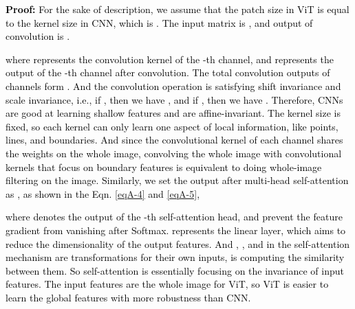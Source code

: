 \documentclass[lettersize,journal]{IEEEtran}
\begin{document}
\textcolor{black}{\textbf{Proof:} For the sake of description, we assume that the patch size in ViT is equal to the kernel size in CNN, which is . The input matrix is , and output of convolution is .
\vspace{-2mm}

where  represents the convolution kernel of the -th channel, and  represents the output of the -th channel after convolution. The total convolution outputs of  channels form . And the convolution operation  is satisfying shift invariance and scale invariance, i.e., if , then we have , and if , then we have . Therefore, CNNs are good at learning shallow features and are affine-invariant. The kernel size is fixed, so each kernel can only learn one aspect of local information, like points, lines, and boundaries. And since the convolutional kernel  of each channel shares the weights on the whole image, convolving the whole image with convolutional kernels that focus on boundary features is equivalent to doing whole-image filtering on the image. Similarly, we set the output after multi-head self-attention as , as shown in the Eqn. \ref{eqA-4} and \ref{eqA-5},
   \vspace{-1mm}
    
where  denotes the output of the -th self-attention head, and  prevent the feature gradient from vanishing after Softmax.  represents the linear layer, which aims to reduce the dimensionality of the output features. And , , and  in the self-attention mechanism are transformations for their own inputs,  is computing the similarity between them. So self-attention is essentially focusing on the invariance of input features. The input features  are the whole image for ViT, so ViT is easier to learn the global features with more robustness than CNN.}

\begin{table}[!ht]
\caption{The specific division of different datasets.}
\label{table_dataset}
\centering
{}
\end{table}
\end{document}
